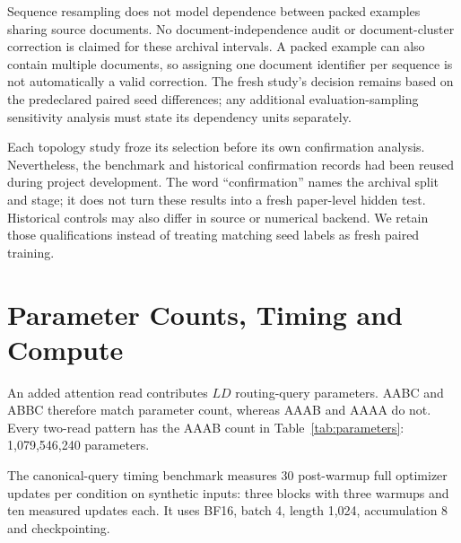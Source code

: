 \documentclass[11pt,letterpaper]{article}
\newcommand{\route}[1]{\textsf{#1}}
\begin{document}
Sequence resampling does not model dependence between packed examples sharing
source documents. No document-independence audit or document-cluster correction
is claimed for these archival intervals. A packed example can also contain
multiple documents, so assigning one document identifier per sequence is not
automatically a valid correction. The fresh study's decision remains based on
the predeclared paired seed differences; any additional evaluation-sampling
sensitivity analysis must state its dependency units separately.

Each topology study froze its selection before its own confirmation analysis.
Nevertheless, the benchmark and historical confirmation records had been
reused during project development. The word ``confirmation'' names the
archival split and stage; it does not turn these results into a fresh paper-level
hidden test. Historical controls may also differ in source or numerical backend.
We retain those qualifications instead of treating matching seed labels as
fresh paired training.


\section{Parameter Counts, Timing and Compute}
\label{app:resources}
\label{sec:costs}
An added attention read contributes $LD$ routing-query parameters.
\route{AABC} and \route{ABBC} therefore match parameter count, whereas
\route{AAAB} and \route{AAAA} do not. Every two-read pattern has the
\route{AAAB} count in Table~\ref{tab:parameters}: 1,079,546,240 parameters.

\begin{table}[!ht]
\centering\small

\caption{Recorded total parameter counts for the completed fresh models,
including tied embedding/output weights once. The last column counts only
attention depth-query weights ($RLD$), excluding shared source/input norms and
the unchanged MLP/final reads. \route{AAAA} contains no dormant extra router.}
\label{tab:parameters}
\end{table}
The canonical-query timing benchmark measures 30 post-warmup full
optimizer updates per condition on synthetic inputs: three blocks
with three warmups and ten measured updates each. It uses BF16,
batch 4, length 1,024, accumulation 8 and checkpointing.
\end{document}
